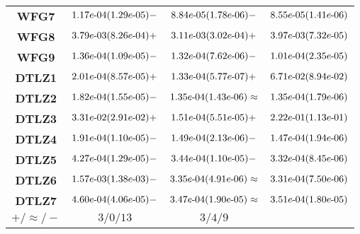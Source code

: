 \documentclass{article}
\begin{document}
\begin{table}[!htp]
\begin{tiny}
\begin{tabular}{c|ccc}
\textbf{WFG7} & ${1.17e\makebox[0.1cm]{-}04(1.29e\makebox[0.1cm]{-}05)-} $ & $ \cellcolor{gray25} {8.84e\makebox[0.1cm]{-}05(1.78e\makebox[0.1cm]{-}06)-} $ & $ \cellcolor{gray95} 8.55e\makebox[0.1cm]{-}05(1.41e\makebox[0.1cm]{-}06)$ \\
\textbf{WFG8} & $\cellcolor{gray25} {3.79e\makebox[0.1cm]{-}03(8.26e\makebox[0.1cm]{-}04)+} $ & $ \cellcolor{gray95} {3.11e\makebox[0.1cm]{-}03(3.02e\makebox[0.1cm]{-}04)+} $ & $ 3.97e\makebox[0.1cm]{-}03(7.32e\makebox[0.1cm]{-}05)$ \\
\textbf{WFG9} & ${1.36e\makebox[0.1cm]{-}04(1.09e\makebox[0.1cm]{-}05)-} $ & $ \cellcolor{gray25} {1.32e\makebox[0.1cm]{-}04(7.62e\makebox[0.1cm]{-}06)-} $ & $ \cellcolor{gray95} 1.01e\makebox[0.1cm]{-}04(2.35e\makebox[0.1cm]{-}05)$ \\
\textbf{DTLZ1} & $\cellcolor{gray25} {2.01e\makebox[0.1cm]{-}04(8.57e\makebox[0.1cm]{-}05)+} $ & $ \cellcolor{gray95} {1.33e\makebox[0.1cm]{-}04(5.77e\makebox[0.1cm]{-}07)+} $ & $ 6.71e\makebox[0.1cm]{-}02(8.94e\makebox[0.1cm]{-}02)$ \\
\textbf{DTLZ2} & ${1.82e\makebox[0.1cm]{-}04(1.55e\makebox[0.1cm]{-}05)-} $ & $ \cellcolor{gray25} {1.35e\makebox[0.1cm]{-}04(1.43e\makebox[0.1cm]{-}06)\approx} $ & $ \cellcolor{gray95} 1.35e\makebox[0.1cm]{-}04(1.79e\makebox[0.1cm]{-}06)$ \\
\textbf{DTLZ3} & $\cellcolor{gray25} {3.31e\makebox[0.1cm]{-}02(2.91e\makebox[0.1cm]{-}02)+} $ & $ \cellcolor{gray95} {1.51e\makebox[0.1cm]{-}04(5.51e\makebox[0.1cm]{-}05)+} $ & $ 2.22e\makebox[0.1cm]{-}01(1.13e\makebox[0.1cm]{-}01)$ \\
\textbf{DTLZ4} & ${1.91e\makebox[0.1cm]{-}04(1.10e\makebox[0.1cm]{-}05)-} $ & $ \cellcolor{gray25} {1.49e\makebox[0.1cm]{-}04(2.13e\makebox[0.1cm]{-}06)-} $ & $ \cellcolor{gray95} 1.47e\makebox[0.1cm]{-}04(1.94e\makebox[0.1cm]{-}06)$ \\
\textbf{DTLZ5} & ${4.27e\makebox[0.1cm]{-}04(1.29e\makebox[0.1cm]{-}05)-} $ & $ \cellcolor{gray25} {3.44e\makebox[0.1cm]{-}04(1.10e\makebox[0.1cm]{-}05)-} $ & $ \cellcolor{gray95} 3.32e\makebox[0.1cm]{-}04(8.45e\makebox[0.1cm]{-}06)$ \\
\textbf{DTLZ6} & ${1.57e\makebox[0.1cm]{-}03(1.38e\makebox[0.1cm]{-}03)-} $ & $ \cellcolor{gray25} {3.35e\makebox[0.1cm]{-}04(4.91e\makebox[0.1cm]{-}06)\approx} $ & $ \cellcolor{gray95} 3.31e\makebox[0.1cm]{-}04(7.50e\makebox[0.1cm]{-}06)$ \\
\textbf{DTLZ7} & ${4.60e\makebox[0.1cm]{-}04(4.06e\makebox[0.1cm]{-}05)-} $ & $ \cellcolor{gray95} {3.47e\makebox[0.1cm]{-}04(1.90e\makebox[0.1cm]{-}05)\approx} $ & $ \cellcolor{gray25} 3.51e\makebox[0.1cm]{-}04(1.80e\makebox[0.1cm]{-}05)$ \\
  \hline
\textbf{$+/\approx/-$} & $3/0/13 $ & $ 3/4/9$ \\
  \end{tabular}
  \end{tiny}
\end{table}
\end{document}
